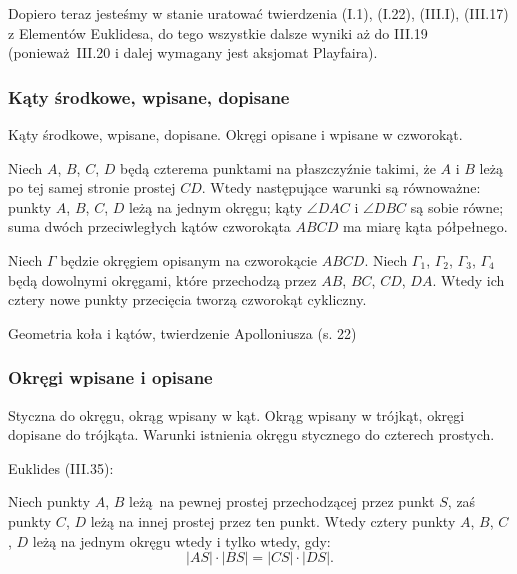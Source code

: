 Dopiero teraz jesteśmy w stanie uratować twierdzenia (I.1), (I.22), (III.I), (III.17) z Elementów Euklidesa, do tego wszystkie dalsze wyniki aż do III.19 (ponieważ III.20 i dalej wymagany jest aksjomat Playfaira).

\subsubsection{Kąty środkowe, wpisane, dopisane}
Kąty środkowe, wpisane, dopisane.
Okręgi opisane i wpisane w czworokąt.

\begin{proposition}
	Niech $A$, $B$, $C$, $D$ będą czterema punktami na płaszczyźnie takimi, że $A$ i $B$ leżą po tej samej stronie prostej $CD$.
	Wtedy następujące warunki są równoważne: punkty $A$, $B$, $C$, $D$ leżą na jednym okręgu; kąty $\angle DAC$ i $\angle DBC$ są sobie równe; suma dwóch przeciwległych kątów czworokąta $ABCD$ ma miarę kąta półpełnego.
\end{proposition}

\begin{proposition}
	Niech $\Gamma$ będzie okręgiem opisanym na czworokącie $ABCD$.
	Niech $\Gamma_1$, $\Gamma_2$, $\Gamma_3$, $\Gamma_4$ będą dowolnymi okręgami, które przechodzą przez $AB$, $BC$, $CD$, $DA$.
	Wtedy ich cztery nowe punkty przecięcia tworzą czworokąt cykliczny.
\end{proposition}

Geometria koła i kątów, twierdzenie Apolloniusza (s. 22)

\subsubsection{Okręgi wpisane i opisane}
Styczna do okręgu, okrąg wpisany w kąt.
Okrąg wpisany w trójkąt, okręgi dopisane do trójkąta.
Warunki istnienia okręgu stycznego do czterech prostych.

Euklides (III.35):

\begin{proposition}
    \label{prop_intersecting_chords}
	Niech punkty $A$, $B$ leżą na pewnej prostej przechodzącej przez punkt $S$, zaś punkty $C$, $D$ leżą na innej prostej przez ten punkt.
	Wtedy cztery punkty $A$, $B$, $C$, $D$ leżą na jednym okręgu wtedy i tylko wtedy, gdy:
	\begin{equation}
		|AS| \cdot |BS| = |CS| \cdot |DS|.
	\end{equation}
\end{proposition}

